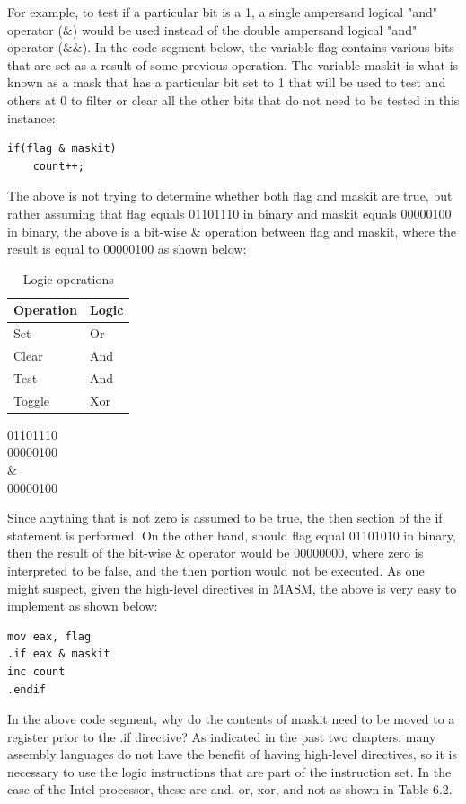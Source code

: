 \documentclass[10pt]{book}
\begin{document}
For example, to test if a particular bit is a 1, a single ampersand logical "and" operator ($\&$) would be used instead of the double ampersand logical "and" operator ($\&\&$). In the code segment below, the variable flag contains various bits that are set as a result of some previous operation. The variable maskit is what is known as a mask that has a particular bit set to 1 that will be used to test and others at 0 to filter or clear all the other bits that do not need to be tested in this instance:

\begin{verbatim}
if(flag & maskit)
    count++;
\end{verbatim}

The above is not trying to determine whether both flag and maskit are true, but rather assuming that flag equals 01101110 in binary and maskit equals 00000100 in binary, the above is a bit-wise \& operation between flag and maskit, where the result is equal to 00000100 as shown below:

\begin{table}[htbp]
\centering
\caption{Logic operations}
\begin{tabular}{|l l|}
\hline
\textbf{Operation} & \textbf{Logic} \\
\hline
Set & Or \\
Clear & And \\
Test & And \\
Toggle & Xor \\
\hline
\end{tabular}
\end{table}

01101110\\
00000100\\
\&\\
00000100

Since anything that is not zero is assumed to be true, the then section of the if statement is performed. On the other hand, should flag equal 01101010 in binary, then the result of the bit-wise \& operator would be 00000000, where zero is interpreted to be false, and the then portion would not be executed. As one might suspect, given the high-level directives in MASM, the above is very easy to implement as shown below:
\begin{verbatim}
mov eax, flag
.if eax & maskit
inc count
.endif
\end{verbatim}

In the above code segment, why do the contents of maskit need to be moved to a register prior to the .if directive? As indicated in the past two chapters, many assembly languages do not have the benefit of having high-level directives, so it is necessary to use the logic instructions that are part of the instruction set. In the case of the Intel processor, these are and, or, xor, and not as shown in Table 6.2.
\end{document}
